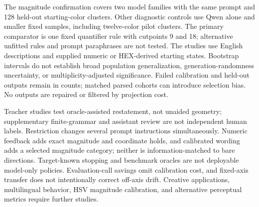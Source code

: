 \documentclass[11pt]{article}
\begin{document}
The magnitude confirmation covers two model families with the same prompt
and 128 held-out starting-color clusters. Other diagnostic controls use Qwen
alone and smaller fixed samples, including twelve-color pilot clusters.
The primary comparator is one fixed quantifier rule with cutpoints 9 and 18;
alternative unfitted rules and prompt paraphrases are not tested.
The studies use English descriptions and supplied numeric or HEX-derived
starting states. Bootstrap intervals do not establish broad population
generalization, generation-randomness uncertainty, or multiplicity-adjusted
significance. Failed calibration and held-out outputs remain in counts;
matched parsed cohorts can introduce
selection bias. No outputs are repaired or filtered by projection cost.

Teacher studies test oracle-assisted restatement, not unaided geometry;
supplementary finite-grammar and assistant review are not independent human
labels. Restriction changes several prompt instructions simultaneously.
Numeric feedback adds exact magnitude and coordinate holds, and calibrated
wording adds a selected magnitude category; neither is information-matched
to bare directions. Target-known stopping and benchmark oracles are not
deployable model-only policies. Evaluation-call savings omit calibration
cost, and fixed-axis transfer does not intentionally correct off-axis drift.
Creative applications, multilingual behavior, HSV magnitude calibration,
and alternative perceptual metrics require further studies.

\begingroup
\let\aclthebibliography\thebibliography
\renewcommand{\thebibliography}[1]{%
  \aclthebibliography{#1}\raggedright}

\endgroup
\appendix

\end{document}
